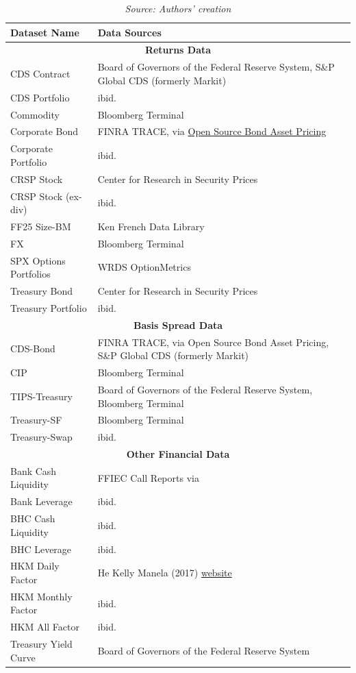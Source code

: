 \documentclass{article}
\begin{document}
\begin{table}[htbp]
\centering
\caption{Data Sources by Dataset}
\label{tab:data_sources}
\footnotesize
\begin{tabular}{p{4cm}p{8cm}}
\toprule
Dataset Name & Data Sources \\ 
\midrule
\multicolumn{2}{c}{\textbf{Returns Data}} \\
\midrule
CDS Contract & Board of Governors of the Federal Reserve System, S\&P Global CDS (formerly Markit) \\
CDS Portfolio & ibid. \\
Commodity & Bloomberg Terminal \\
Corporate Bond & FINRA TRACE, via \href{https://openbondassetpricing.com/}{Open Source Bond Asset Pricing}  \\
Corporate Portfolio & ibid. \\
CRSP Stock & Center for Research in Security Prices \\
CRSP Stock (ex-div) & ibid. \\
FF25 Size-BM & Ken French Data Library \\
FX & Bloomberg Terminal \\
SPX Options Portfolios & WRDS OptionMetrics \\
Treasury Bond & Center for Research in Security Prices \\
Treasury Portfolio & ibid. \\
\midrule
\multicolumn{2}{c}{\textbf{Basis Spread Data}} \\
\midrule
CDS-Bond & FINRA TRACE, via Open Source Bond Asset Pricing, S\&P Global CDS (formerly Markit) \\
CIP & Bloomberg Terminal \\
TIPS-Treasury & Board of Governors of the Federal Reserve System, Bloomberg Terminal \\
Treasury-SF & Bloomberg Terminal \\
Treasury-Swap & ibid. \\
\midrule
\multicolumn{2}{c}{\textbf{Other Financial Data}} \\
\midrule
Bank Cash Liquidity & FFIEC Call Reports via \cite{Drechsler2017} \\
Bank Leverage & ibid. \\
BHC Cash Liquidity & ibid. \\
BHC Leverage & ibid. \\
HKM Daily Factor & He Kelly Manela (2017) \href{https://zhiguohe.net/data-and-empirical-patterns/intermediary-capital-ratio-and-risk-factor/}{website}\\
HKM Monthly Factor & ibid. \\
HKM All Factor & ibid. \\
Treasury Yield Curve & Board of Governors of the Federal Reserve System \\
\bottomrule
\end{tabular}
\caption*{\emph{Source: Authors' creation}}
\end{table}
\end{document}
